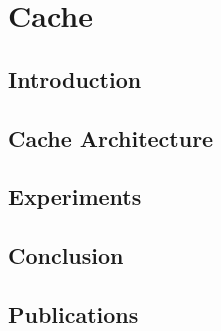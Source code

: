 \chapter{Cache} %
\label{cha:cache}

\minitoc

\lipsum

\section{Introduction} %
\label{sec:cache_introduction}

\lipsum


\section{Cache Architecture} %
\label{sec:cache_architecture}

\lipsum


\section{Experiments} %
\label{sec:cache_experiments}

\lipsum


\section{Conclusion} %
\label{sec:cache_conclusion}

\lipsum


\section{Publications} %
\label{sec:cache_publications}


